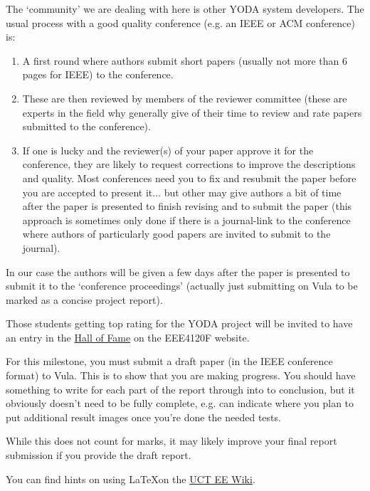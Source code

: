 The `community' we are dealing with here is other YODA system developers. The usual process with a good quality conference (e.g. an IEEE or ACM conference) is:
\begin{enumerate}
    \item A first round where authors submit short papers (usually not more than 6 pages for IEEE) to the conference.
    \item These are then reviewed by members of the reviewer committee (these are experts in the field why generally give of their time to review and rate papers submitted to the conference).
    \item If one is lucky and the reviewer(s) of your paper approve it for the conference, they are likely to request corrections to improve the descriptions and quality. Most conferences need you to fix and resubmit the paper before you are accepted to present it... but other may give authors a bit of time after the paper is presented to finish revising and to submit the paper  (this approach is sometimes only done if there is a journal-link to the conference where authors of particularly good papers are invited to submit to the journal).
\end{enumerate}

In our case the authors will be given a few days after the paper is presented to submit it to the `conference proceedings' (actually just submitting on Vula to be marked as a concise project report).

Those students getting top rating for the YODA project will be invited to have an entry in the \href{http://ocw.ee.uct.ac.za/courses/EEE4120F/HOF.html}{Hall of Fame} on the EEE4120F website.


For this milestone, you must submit a draft paper (in the IEEE conference format) to Vula. This is to show that you are making progress. You should have something to write for each part of the report through into to conclusion, but it obviously doesn't need to be fully complete, e.g. can indicate where you plan to put additional result images once you're done the needed tests.

While this does not count for marks, it may likely improve your final report submission if you provide the draft report.

You can find hints on using \LaTeX \space on the \href{http://wiki.ee.uct.ac.za/LaTeX}{UCT EE Wiki}.

